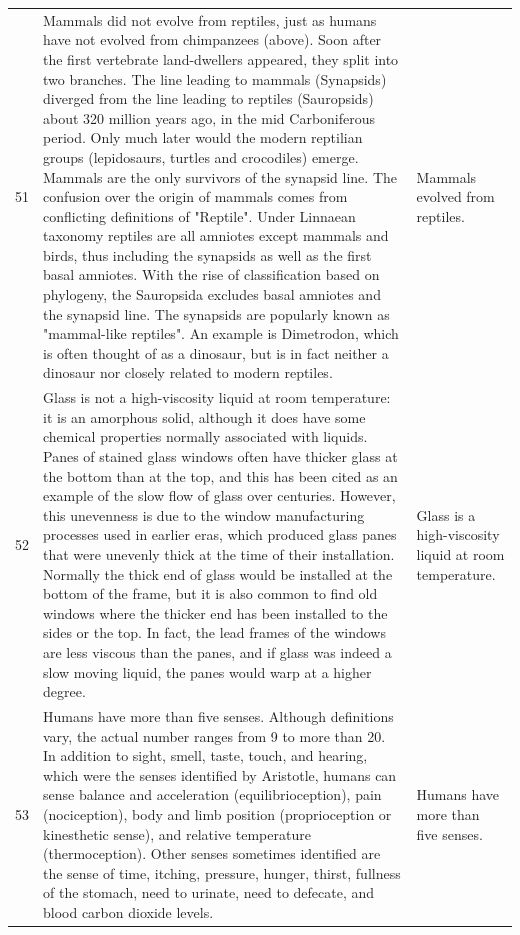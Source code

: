 \begin{tabular}{c|p{}|p{}}
51 & Mammals did not evolve from reptiles, just as humans have not evolved from chimpanzees (above). Soon after the first vertebrate land-dwellers appeared, they split into two branches. The line leading to mammals (Synapsids) diverged from the line leading to reptiles (Sauropsids) about 320 million years ago, in the mid Carboniferous period. Only much later would the modern reptilian groups (lepidosaurs, turtles and crocodiles) emerge. Mammals are the only survivors of the synapsid line. The confusion over the origin of mammals comes from conflicting definitions of "Reptile". Under Linnaean taxonomy reptiles are all amniotes except mammals and birds, thus including the synapsids as well as the first basal amniotes. With the rise of classification based on phylogeny, the Sauropsida excludes basal amniotes and the synapsid line. The synapsids are popularly known as "mammal-like reptiles". An example is Dimetrodon, which is often thought of as a dinosaur, but is in fact neither a dinosaur nor closely related to modern reptiles. & Mammals evolved from reptiles. \\
52 & Glass is not a high-viscosity liquid at room temperature: it is an amorphous solid, although it does have some chemical properties normally associated with liquids. Panes of stained glass windows often have thicker glass at the bottom than at the top, and this has been cited as an example of the slow flow of glass over centuries. However, this unevenness is due to the window manufacturing processes used in earlier eras, which produced glass panes that were unevenly thick at the time of their installation. Normally the thick end of glass would be installed at the bottom of the frame, but it is also common to find old windows where the thicker end has been installed to the sides or the top. In fact, the lead frames of the windows are less viscous than the panes, and if glass was indeed a slow moving liquid, the panes would warp at a higher degree. & Glass is a high-viscosity liquid at room temperature. \\
53 & Humans have more than five senses. Although definitions vary, the actual number ranges from 9 to more than 20. In addition to sight, smell, taste, touch, and hearing, which were the senses identified by Aristotle, humans can sense balance and acceleration (equilibrioception), pain (nociception), body and limb position (proprioception or kinesthetic sense), and relative temperature (thermoception). Other senses sometimes identified are the sense of time, itching, pressure, hunger, thirst, fullness of the stomach, need to urinate, need to defecate, and blood carbon dioxide levels. & Humans have more than five senses. \\

\end{tabular}
